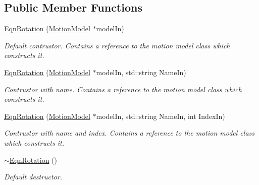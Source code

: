 \subsection*{Public Member Functions}
\begin{DoxyCompactItemize}
\item 
\hyperlink{classosea_1_1ofreq_1_1_eqn_rotation_ad7db707de22fbc8675beda31f20a1bfe}{Eqn\-Rotation} (\hyperlink{classosea_1_1ofreq_1_1_motion_model}{Motion\-Model} $\ast$model\-In)
\begin{DoxyCompactList}\small\item\em Default contrustor. Contains a reference to the motion model class which constructs it. \end{DoxyCompactList}\item 
\hyperlink{classosea_1_1ofreq_1_1_eqn_rotation_a157f992af361fd8935c09acff55aa25c}{Eqn\-Rotation} (\hyperlink{classosea_1_1ofreq_1_1_motion_model}{Motion\-Model} $\ast$model\-In, std\-::string Name\-In)
\begin{DoxyCompactList}\small\item\em Contrustor with name. Contains a reference to the motion model class which constructs it. \end{DoxyCompactList}\item 
\hyperlink{classosea_1_1ofreq_1_1_eqn_rotation_ae85fd4be31900819f56768f4eff19644}{Eqn\-Rotation} (\hyperlink{classosea_1_1ofreq_1_1_motion_model}{Motion\-Model} $\ast$model\-In, std\-::string Name\-In, int Index\-In)
\begin{DoxyCompactList}\small\item\em Contrustor with name and index. Contains a reference to the motion model class which constructs it. \end{DoxyCompactList}\item 
\hyperlink{classosea_1_1ofreq_1_1_eqn_rotation_a13f491e18770b8412b3babb610068d8c}{$\sim$\-Eqn\-Rotation} ()
\begin{DoxyCompactList}\small\item\em Default destructor. \end{DoxyCompactList}\end{DoxyCompactItemize}
